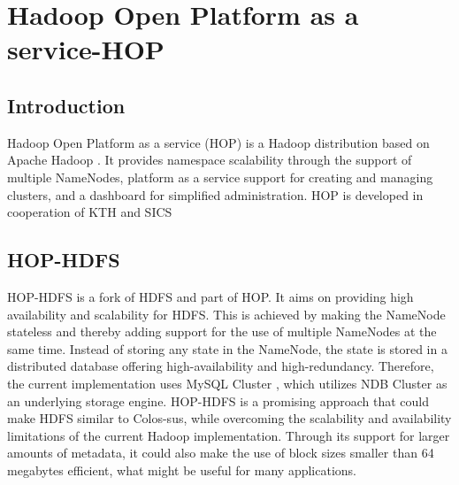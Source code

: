 
%
%
%


\chapter{Hadoop Open Platform as a service-HOP}
\label{ch:HOP}



\section{Introduction}

Hadoop Open Platform as a service (HOP) \cite{10} is a Hadoop distribution based
on Apache Hadoop . It provides namespace scalability through the support of multiple
NameNodes, platform as a service support for creating and managing clusters,
and a dashboard for simplified administration. HOP is developed in cooperation
of KTH and SICS \cite{15}



\section{HOP-HDFS}

HOP-HDFS\cite{11} \cite{12} is a fork of HDFS and part of HOP. It aims on providing high
availability and scalability for HDFS. This is achieved by making the NameNode
stateless and thereby adding support for the use of multiple NameNodes at the
same time. Instead of storing any state in the NameNode, the state is stored in
a distributed database offering high-availability and high-redundancy. Therefore,
the current implementation uses MySQL Cluster \cite{29}, which utilizes NDB Cluster
as an underlying storage engine.
HOP-HDFS is a promising approach that could make HDFS similar to Colos-sus, while overcoming the scalability and availability limitations of the current
Hadoop implementation. Through its support for larger amounts of metadata, it
could also make the use of block sizes smaller than 64 megabytes efficient, what
might be useful for many applications.



